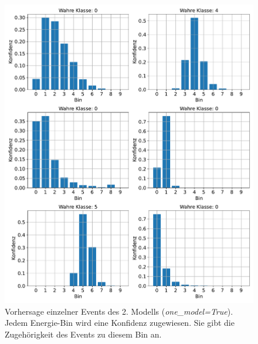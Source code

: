 \begin{figure}%
    \centering%
    \includegraphics[width=\textwidth]{Plots/DSEA/True/SingleEvents_10bins_60ep_500000samples_200pulls.pdf}%
    \caption[Vorhersage einzelner Events des 2. Modells in DSEA]{Vorhersage einzelner Events des 2. Modells (\textit{one\_model=True}).
    Jedem Energie-Bin wird eine Konfidenz zugewiesen.
    Sie gibt die Zugehörigkeit des Events zu diesem Bin an.
    }%
    \label{fig:dsea_single_events_true}%
\end{figure}

